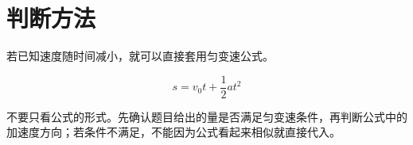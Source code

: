\section{判断方法}

若已知速度随时间减小，就可以直接套用匀变速公式。

\begin{equation}
  s=v_0t+\frac{1}{2}at^2
\end{equation}

不要只看公式的形式。先确认题目给出的量是否满足匀变速条件，再判断公式中的加速度方向；若条件不满足，不能因为公式看起来相似就直接代入。
